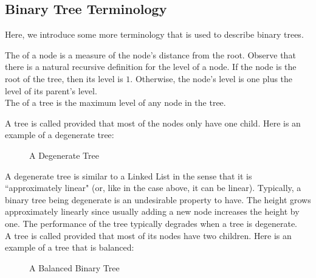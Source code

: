 \subsection{Binary Tree Terminology}

Here, we introduce some more terminology that is used to describe binary trees. 

The  of a node is a measure of the node's distance from the root. Observe that there is a natural recursive definition for the level of a node. If the node is the root of the tree, then its level is $1$. Otherwise, the node's level is one plus the level of its parent's level. \\

The  of a tree is the maximum level of any node in the tree.

A tree is called  provided that most of the nodes only have one child. Here is an example of a degenerate tree:

\begin{figure}[h]
\centering
{}
\caption{A Degenerate Tree}
\end{figure}

A degenerate tree is similar to a Linked List in the sense that it is ``approximately linear" (or, like in the case above, it can be linear). Typically, a binary tree being degenerate is an undesirable property to have. The height grows approximately linearly since usually adding a new node increases the height by one. The performance of the tree typically degrades when a tree is degenerate. \\

A tree is called  provided that most of its nodes have two children. Here is an example of a tree that is balanced:

\begin{figure}[h]
\centering
{}
\caption{A Balanced Binary Tree}
\end{figure}

